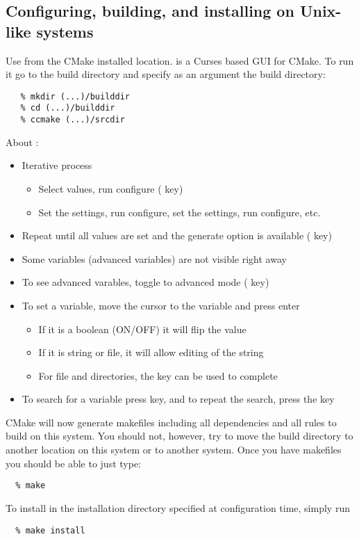 \subsection{Configuring, building, and installing on Unix-like systems}

Use  from the CMake installed location.  is a
Curses based GUI for CMake.  To run it go to the build directory and
specify as an argument the build directory:
\begin{verbatim}
   % mkdir (...)/builddir
   % cd (...)/builddir
   % ccmake (...)/srcdir
\end{verbatim}

About :
\begin{itemize}
\item  Iterative process
  \begin{itemize}
  \item Select values, run configure ( key)
  \item Set the settings, run configure, set the settings, run configure, etc. 
  \end{itemize}
\item Repeat until all values are set and the generate option is available ( key)
\item Some variables (advanced variables) are not visible right away
\item To see advanced varables, toggle to advanced mode ( key)
\item To set a variable, move the cursor to the variable and press enter
  \begin{itemize}
  \item If it is a boolean (ON/OFF) it will flip the value
  \item If it is string or file, it will allow editing of the string
  \item For file and directories, the  key can be used to complete 
  \end{itemize}
\item To search for a variable press \id{/} key, and to repeat the search, press the
 key
\end{itemize}

CMake will now generate makefiles including all dependencies and all rules to build 
{\sundials} on this system. You should not, however, try to move the build directory 
to another location on this system or to another system.
Once you have makefiles you should be able to just type: 
\begin{verbatim}
  % make
\end{verbatim}
To install {\sundials} in the installation directory specified at configuration time, simply run
\begin{verbatim}
  % make install
\end{verbatim}

